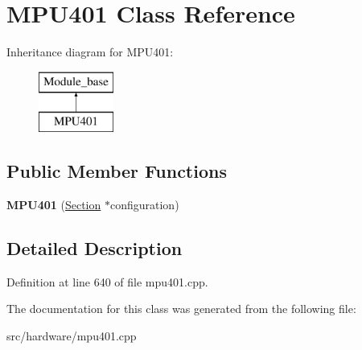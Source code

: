 \hypertarget{classMPU401}{\section{M\-P\-U401 Class Reference}
\label{classMPU401}
}
Inheritance diagram for M\-P\-U401\-:\begin{figure}[H]
\begin{center}
\leavevmode
\includegraphics[height=2.000000cm]{classMPU401}
\end{center}
\end{figure}
\subsection*{Public Member Functions}
\begin{DoxyCompactItemize}
\item 
\hypertarget{classMPU401_a7df40b93d9eb674d176f26e368af32f2}{{\bfseries M\-P\-U401} (\hyperlink{classSection}{Section} $\ast$configuration)}\label{classMPU401_a7df40b93d9eb674d176f26e368af32f2}

\end{DoxyCompactItemize}


\subsection{Detailed Description}


Definition at line 640 of file mpu401.\-cpp.



The documentation for this class was generated from the following file\-:\begin{DoxyCompactItemize}
\item 
src/hardware/mpu401.\-cpp\end{DoxyCompactItemize}

